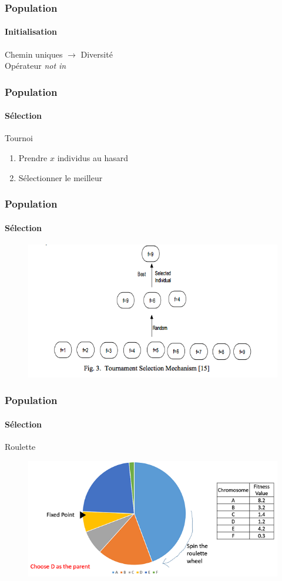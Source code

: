 \documentclass[16pt]{beamer}
\begin{document}
\begin{frame}
  \frametitle{Population}
  \framesubtitle{Initialisation}
  Chemin uniques $\rightarrow$ Diversité \\
  Opérateur \emph{not in}
\end{frame}

\begin{frame}
  \frametitle{Population}
  \framesubtitle{Sélection}
  Tournoi
  \begin{enumerate}
    \item Prendre $x$ individus au hasard
    \item Sélectionner le meilleur 
  \end{enumerate}
\end{frame}

\begin{frame}
  \frametitle{Population}
  \framesubtitle{Sélection}
  \begin{figure}
    \includegraphics[scale=0.4]{tournament.png}
  \end{figure}
\end{frame}

\begin{frame}
  \frametitle{Population}
  \framesubtitle{Sélection}
  \centering
  Roulette \pause{}
  \begin{figure}
    \includegraphics[scale=0.6]{roulette.jpg}
  \end{figure}
\end{frame}
\end{document}

